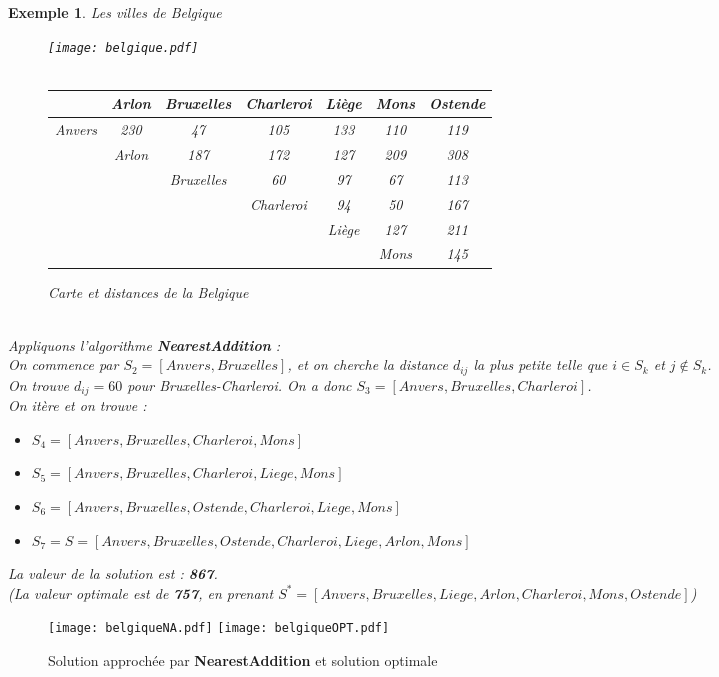 \documentclass[12pt]{article}
\newtheorem{exemple}{Exemple}[section]
\begin{document}
\begin{exemple}Les villes de Belgique\\
\begin{figure}[H]
    \begin{center}
    \texttt{[image: belgique.pdf]}$ $\\$ $\\
    \begin{tabular}{r|c|c|c|c|c|c|}
	 & Arlon & Bruxelles & Charleroi & Liège & Mons & Ostende \\
	\hline
	Anvers & 230 & 47 & 105 & 133 & 110 & 119 \\
	& Arlon & 187 & 172 & 127 & 209 & 308 \\
	& & Bruxelles & 60 & 97 & 67 & 113 \\
	& & & Charleroi & 94 & 50 & 167 \\
	& & & & Liège & 127 & 211 \\
	& & & & & Mons & 145
	\end{tabular}
    \caption{Carte et distances de la Belgique}
    \end{center}
\end{figure}
$ $\\
Appliquons l'algorithme \textbf{NearestAddition} : \\
On commence par $S_2 = [Anvers,Bruxelles]$, et on cherche la distance $d_{ij}$ la plus petite telle que $i\in S_k$ et $j \not\in S_k$.\\
On trouve $d_{ij} = 60$ pour Bruxelles-Charleroi. On a donc $S_3 = [Anvers,Bruxelles,Charleroi]$.\\
On itère et on trouve :
\begin{itemize}
\item $S_4 = [Anvers,Bruxelles,Charleroi,Mons]$
\item $S_5 = [Anvers,Bruxelles,Charleroi,Liege,Mons]$
\item $S_6 = [Anvers,Bruxelles,Ostende,Charleroi,Liege,Mons]$
\item $S_7 = S = [Anvers,Bruxelles,Ostende,Charleroi,Liege,Arlon,Mons]$
\end{itemize}
La valeur de la solution est : \textbf{867}. \\
\textit{(La valeur optimale est de \textbf{757}, en prenant $S^* = [Anvers,Bruxelles,Liege,Arlon,Charleroi,Mons,Ostende]$)}
\end{exemple}
\begin{figure}[H]
    \begin{center}
    \texttt{[image: belgiqueNA.pdf]}
    \texttt{[image: belgiqueOPT.pdf]}
    \caption{Solution approchée par \textbf{NearestAddition} et solution optimale}
    \end{center}
\end{figure}
\end{document}
